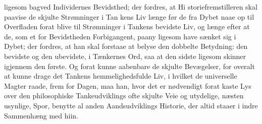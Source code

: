 ligesom bagved Individernes Bevidsthed; der fordres, at Hi\-%
storiefremstilleren skal paavise de skjulte Strømninger i Tan\-%
kens Liv længe før de fra Dybet naae op til Overfladen forat
blive til Strømninger i Tankens bevidste Liv, og længe efter
at de, som et for Bevidstheden Forbigangent, paany ligesom
have sænket sig i Dybet; der fordres, at han skal forstaae at
belyse den dobbelte Betydning: den bevidste og den ubevidste,
i Tænkernes Ord, saa at den sidste ligesom skinner igjennem den
første. Og forat kunne aabenbare de skjulte Bevægelser,
for overalt at kunne drage det Tankens hemmelighedsfulde
Liv, i hvilket de universelle Magter raade, frem for Dagen,
maa han, hvor det er nødvendigt forat kaste Lys over den
philosophiske Tankeudviklings ofte skjulte Veie og utydelige,
næsten usynlige, Spor, benytte al anden Aandsudviklings
Historie, der altid staaer i indre Sammenhæng med hiin.

